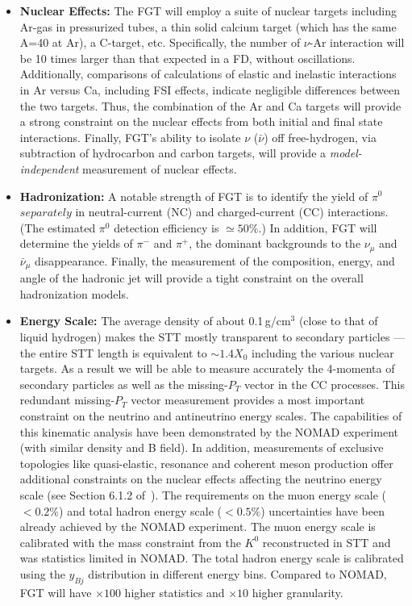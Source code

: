 \begin{itemize}
    \item {\bf Nuclear Effects:} The FGT will employ a suite of
      nuclear targets including Ar-gas in pressurized tubes, a thin
      solid calcium target (which has the same A=40 at Ar), a
      C-target, etc.  Specifically, the number of $\nu$-Ar interaction
      will be 10 times larger than that expected in a  FD,
      without oscillations. Additionally, comparisons of calculations
      of elastic and inelastic interactions in Ar versus Ca, including
      FSI effects, indicate negligible differences between the two
      targets. Thus, the combination of the Ar and Ca targets will
      provide a strong constraint on the nuclear effects from both
      initial and final state interactions.  Finally, FGT's ability to
      isolate $\nu$ ($\bar\nu$) off free-hydrogen, via subtraction of
      hydrocarbon and carbon targets, will provide a 
      {\em model-independent} measurement of nuclear effects.

    \item {\bf Hadronization:} A notable strength of FGT is to
      identify the yield of $\pi^0$ $separately$ in neutral-current
      (NC) and charged-current (CC) interactions. (The estimated
      $\pi^0$ detection efficiency is $\simeq 50\%$.) In addition, FGT
      will determine the yields of $\pi^-$ and $\pi^+$, the dominant
      backgrounds to the $\nu_\mu$ and $\bar\nu_\mu$
      disappearance. Finally, the measurement of the composition,
      energy, and angle of the hadronic jet will provide a tight
      constraint on the overall hadronization models.

    \item {\bf Energy Scale:} The average density of about
      0.1\,g/cm$^3$ (close to that of liquid hydrogen) makes the STT
      mostly transparent to secondary particles --- the entire STT
      length is equivalent to $\sim 1.4 X_0$ including the various
      nuclear targets. As a result we will be able to measure
      accurately the 4-momenta of secondary particles as well as the
      missing-$P_T$ vector in the CC processes.  This redundant
      missing-$P_T$ vector measurement provides a most important
      constraint on the neutrino and antineutrino energy scales. The
      capabilities of this kinematic analysis have been demonstrated
      by the NOMAD experiment (with similar density and B field).  In
      addition, measurements of exclusive topologies like
      quasi-elastic, resonance and coherent meson production offer
      additional constraints on the nuclear effects affecting the
      neutrino energy scale (see Section 6.1.2 of~\cite{cdr-vol-2}).  %
The requirements on the muon energy scale
      ($< 0.2\%$) and total hadron energy scale ($< 0.5\%$)
      uncertainties have been already achieved by the NOMAD
      experiment. The muon energy scale is calibrated with the mass
      constraint from the $K^0$ reconstructed in STT and was
      statistics limited in NOMAD. The total hadron energy scale is
      calibrated using the $y_{Bj}$ distribution in different energy
      bins. Compared to NOMAD, FGT will have $\times 100$ higher
      statistics and $\times 10$ higher granularity.
\end{itemize}

